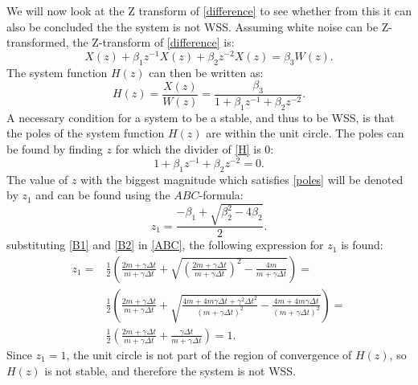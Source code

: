 \documentclass[12pt]{article}
\begin{document}
We will now look at the Z transform of \autoref{difference} to see whether from this it can also be concluded the the system is not WSS. Assuming white noise can be Z-transformed, the Z-transform of \autoref{difference} is:
\begin{equation}\label{Z}
X(z)+\beta_1z^{-1}X(z)+\beta_2z^{-2}X(z)=\beta_3W(z).
\end{equation}
The system function $H(z)$ can then be written as:
\begin{equation}\label{H}
H(z)=\frac{X(z)}{W(z)}=\frac{\beta_3}{1+\beta_1z^{-1}+\beta_2z^{-2}}.
\end{equation}
A necessary condition for a system to be a stable, and thus to be WSS, is that the poles of the system function $H(z)$ are within the unit circle. The poles can be found by finding $z$ for which the divider of \autoref{H} is 0:
\begin{equation}\label{poles}
1+\beta_1z^{-1}+\beta_2z^{-2}=0.
\end{equation}
The value of $z$ with the biggest magnitude which satisfies \autoref{poles} will be denoted by $z_1$ and can be found using the $ABC$-formula:
\begin{equation}\label{ABC}
z_1=\frac{-\beta_1+\sqrt{\beta_2^2-4\beta_2}}{2}.
\end{equation}
substituting \autoref{B1} and \autoref{B2} in \autoref{ABC}, the following expression for $z_1$ is found:
\begin{align*}
z_1=&\frac{1}{2}\left(\frac{2m+\gamma\Delta t}{m+\gamma\Delta t}+\sqrt{\left(\frac{2m+\gamma\Delta t}{m+\gamma\Delta t}\right)^2-\frac{4m}{m+\gamma\Delta t}} \right)=\\
&\frac{1}{2}\left(\frac{2m+\gamma\Delta t}{m+\gamma\Delta t}+\sqrt{\frac{4m+4m\gamma\Delta t+\gamma^2\Delta t^2}{(m+\gamma\Delta t)^2}-\frac{4m+4m\gamma\Delta t}{(m+\gamma\Delta t)^2}}\right) =\\
&\frac{1}{2}\left(\frac{2m+\gamma\Delta t}{m+\gamma\Delta t} + \frac{\gamma\Delta t}{m+\gamma\Delta t}\right) = 1.
\end{align*}
Since $z_1=1$, the unit circle is not part of the region of convergence of $H(z)$, so $H(z)$ is not stable, and therefore the system is not WSS.
\end{document}

